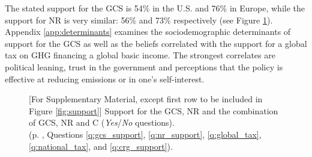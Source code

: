 The stated support for the GCS is 54\% in the U.S. and 76\% in Europe, while the support for NR is very similar: 56\% and 73\% respectively (see Figure \ref{fig:support_binary}). 
Appendix \ref{app:determinants} examines the sociodemographic determinants of support for the GCS as well as the beliefs correlated with the support for a global tax on GHG financing a global basic income. The strongest correlates are political leaning, trust in the government and perceptions that the policy is effective at reducing emissions or in one's self-interest. %


\setcounter{figure}{0}
\renewcommand{\thefigure}{S\arabic{figure}}
\begin{figure}[h!]
    \caption[Support for the Global Climate Scheme]{[For Supplementary Material, except first row to be included in Figure \ref{fig:support}] Support for the GCS, NR and the combination of GCS, NR and C (\textit{Yes}/\textit{No} questions). \\(p. \pageref{subsec:questionnaire_GCS}, Questions \ref{q:gcs_support}, \ref{q:nr_support}, \ref{q:global_tax}, \ref{q:national_tax}, and \ref{q:crg_support}).%
    }\label{fig:support_binary}
\end{figure}

